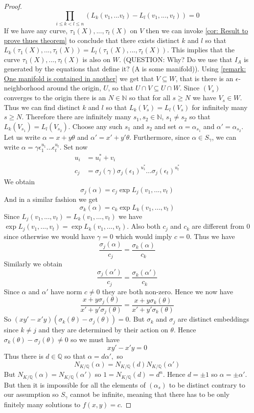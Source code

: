 \documentclass{article}
\newcommand{\mbb}[1]{\mathbb{#1}}
\begin{document}
\begin{proof}
    $$\prod_{i \leq k < l \leq n} (L_k(v_1, ...v_t) - L_l(v_1, ...,  v_t)) = 0$$
    If we have any curve, $\tau_1(X), ..., \tau_t(X)$ on $V$ then we can invoke \cref{cor: Result to prove thues theorem} to conclude that there exists distinct $k$ and $l$ so that $L_{k}(\tau_1(X), ..., \tau_t(X))= L_{l}(\tau_1(X), ..., \tau_t(X))$. This implies that the curve $\tau_1(X), ..., \tau_t(X)$ is also on $W$. (QUESTION: Why? Do we use that $I_A$ is generated by the equations that define it? (A is some manifold)). Using \cref{remark: One manifold is contained in another} we get that $V \subseteq W$, that is there is an $\epsilon$-neighborhood around the origin, $U$, so that $U \cap V \subseteq U \cap W$. Since $(V_s)$ converges to the origin there is an $N \in \mbb N$ so that for all $s \geq N$ we have $V_s \in W$. Thus we can find distinct $k$ and $l$ so that $L_k(V_s) = L_l(V_s)$ for infinitely many $s \geq N$. Therefore there are infinitely many $s_1, s_2 \in \mbb N$, $s_1 \neq s_2$ so that $L_k(V_{s_1}) = L_l(V_{s_2})$. Choose any such $s_1$ and $s_2$ and set $\alpha = \alpha_{s_1}$ and $\alpha' = \alpha_{s_2}$. Let us write $\alpha = x + y \theta$ and $\alpha' = x' + y'\theta$. Furthermore, since $\alpha \in S_\gamma$, we can write $\alpha = \gamma \epsilon_1^{u_1}...\epsilon_t^{u_t}$. Set now 
    \begin{align*}
        u_i &= u_i^* + v_i \\
        c_j &= \sigma_j(\gamma)\sigma_j(\epsilon_1)^{u_1^*}...\sigma_j(\epsilon_t)^{u_t^*}
    \end{align*}
    We obtain
    $$\sigma_j(\alpha) = c_j \exp L_j(v_1, ..., v_t)$$
    And in a similar fashion we get
    $$\sigma_k(\alpha) = c_k \exp L_k(v_1, ..., v_t)$$ 
    Since $L_j(v_1, ..., v_t) = L_k(v_1, ..., v_t)$ we have $\exp L_j(v_1, ..., v_t) = \exp L_k(v_1, ..., v_t)$. Also both $c_j$ and $c_k$ are different from 0 since otherwise we would have $\gamma = 0$ which would imply $c = 0$. Thus we have
    $$\frac{\sigma_j(\alpha)}{c_j} = \frac{\sigma_k(\alpha)}{c_k}$$
    Similarly we obtain 
    $$\frac{\sigma_j(\alpha')}{c_j} = \frac{\sigma_k(\alpha')}{c_k}$$
    Since $\alpha$ and $\alpha'$ have norm $c \neq 0$ they are both non-zero. Hence we now have
    $$\frac{x + y \sigma_j(\theta)}{x' + y' \sigma_j(\theta)} = \frac{x + y \sigma_k(\theta)}{x' + y' \sigma_k(\theta)}$$
    So
    $(xy' - x'y)(\sigma_k(\theta) - \sigma_j(\theta)) = 0$.
    But $\sigma_k$ and $\sigma_j$ are distinct embeddings since $k \neq j$ and they are determined by their action on $\theta$. Hence $\sigma_k(\theta) - \sigma_j(\theta) \neq 0$ so we must have 
    $$xy' - x'y = 0$$
    Thus there is $d \in \mbb Q$ so that
    $\alpha = d\alpha',$ so $$N_{K/\mbb Q}(\alpha) = N_{K/\mbb Q}(d) N_{K/\mbb Q}(\alpha')$$
    But $N_{K/\mbb Q}(\alpha) = N_{K/\mbb Q}(\alpha')$ so $1 = N_{K/\mbb Q}(d) = d^n$. Hence $d = \pm 1$ so $\alpha = \pm \alpha'$. But then it is impossible for all the elements of $(\alpha_s)$ to be distinct contrary to our assumption so $S_\gamma$ cannot be infinite, meaning that there has to be only finitely many solutions to $f(x, y) = c$. 
\end{proof}
\end{document}
